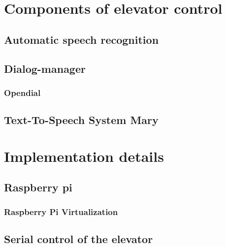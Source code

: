 \documentclass[a4paper, 12pt]{article}
\begin{document}


\pagestyle{empty}

\pagestyle{plain}
\setcounter{page}{1}
\tableofcontents
\cleardoublepage

\section{Components of elevator control}

\subsection{Automatic speech recognition}




%

\subsection{Dialog-manager}

\subsubsection{Opendial}
\label{sec:opendial}


\subsection{Text-To-Speech System Mary}

\section{Implementation details}
\subsection{Raspberry pi}
\subsubsection{Raspberry Pi Virtualization}

\subsection{Serial control of the elevator}

\end{document}
